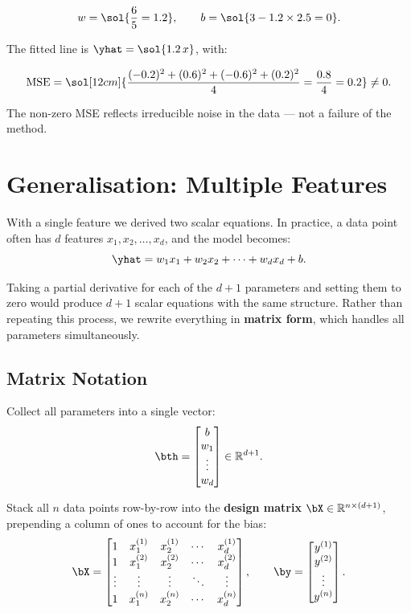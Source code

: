 \documentclass[12pt, a4paper]{article}
\begin{document}
\[
  w = \sol{\dfrac{6}{5} = 1.2},
  \qquad
  b = \sol{3 - 1.2 \times 2.5 = 0}.
\]

The fitted line is $\yhat = \sol{1.2\,x}$, with:

\[
  \mathrm{MSE}
  = \sol[12cm]{\frac{(-0.2)^2 + (0.6)^2 + (-0.6)^2 + (0.2)^2}{4} = \dfrac{0.8}{4} = 0.2}
  \neq 0.
\]

The non-zero MSE reflects irreducible noise in the data — not a failure of the
method.

\section{Generalisation: Multiple Features}

With a single feature we derived two scalar equations. In practice, a data
point often has $d$ features $x_1, x_2, \ldots, x_d$, and the model becomes:
\[
  \yhat = w_1 x_1 + w_2 x_2 + \cdots + w_d x_d + b.
\]

Taking a partial derivative for each of the $d+1$ parameters and setting them
to zero would produce $d+1$ scalar equations with the same structure. Rather
than repeating this process, we rewrite everything in \textbf{matrix form},
which handles all parameters simultaneously.

\subsection{Matrix Notation}

Collect all parameters into a single vector:
\[
  \bth = \begin{bmatrix} b \\ w_1 \\ \vdots \\ w_d \end{bmatrix}
  \in \mathbb{R}^{d+1}.
\]

Stack all $n$ data points row-by-row into the \textbf{design matrix}
$\bX \in \mathbb{R}^{n \times (d+1)}$, prepending a column of ones to account
for the bias:
\[
  \bX =
  \begin{bmatrix}
    1      & x_1^{(1)} & x_2^{(1)} & \cdots & x_d^{(1)} \\
    1      & x_1^{(2)} & x_2^{(2)} & \cdots & x_d^{(2)} \\
    \vdots & \vdots    & \vdots    & \ddots & \vdots    \\
    1      & x_1^{(n)} & x_2^{(n)} & \cdots & x_d^{(n)}
  \end{bmatrix},
  \qquad
  \by =
  \begin{bmatrix} y^{(1)} \\ y^{(2)} \\ \vdots \\ y^{(n)} \end{bmatrix}.
\]
\end{document}
